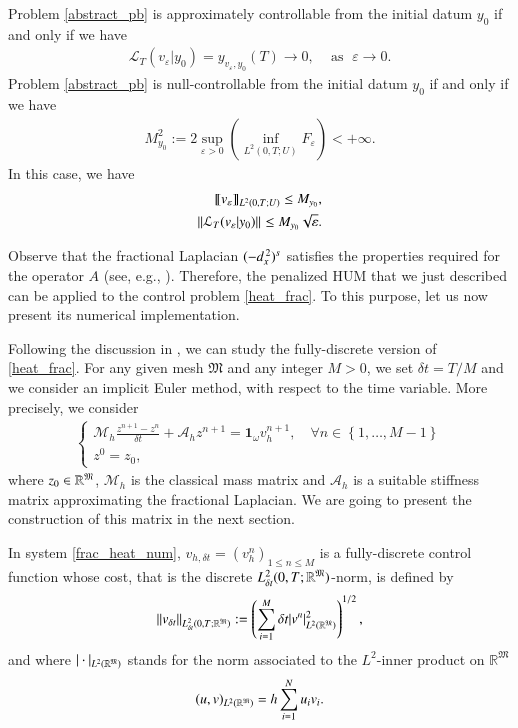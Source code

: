 \begin{theorem}\label{theorem_hum}
Problem \eqref{abstract_pb} is approximately controllable from the initial datum $y_0$ if and only if we have
\begin{align*}
	\mathcal{L}_T(v_\varepsilon|y_0) = y_{v_\varepsilon,y_0}(T)\rightarrow 0,\;\;\;\textrm{ as }\;\varepsilon\to 0.
\end{align*}
Problem \eqref{abstract_pb} is null-controllable from the initial datum $y_0$ if and only if we have
\begin{align*}
	M_{y_0}^2:=2\sup_{\varepsilon>0}\left( \inf_{L^2(0,T;U)}F_\varepsilon\right)<+\infty.
\end{align*}
In this case, we have 
\begin{align*}
	\llbracket v_\varepsilon\rrbracket_{L^2(0,T;U)}\leq M_{y_0},\nonumber
	\\
	{\left\|\mathcal L_T(v_\varepsilon|y_0)\right\|}_{}\leq M_{y_0}\sqrt{\varepsilon}.
\end{align*} 
\end{theorem} 

Observe that the fractional Laplacian $(-d_x^{\,2})^{s}$ satisfies the properties required for the operator $A$ (see, e.g., \cite[Theorem 2.14]{gal2017nonlocal}). Therefore, the penalized HUM that we just described can be applied to the control problem \eqref{heat_frac}. To this purpose, let us now present its numerical implementation. 

Following the discussion in \cite{boyer2011uniform}, we can study the fully-discrete version of \eqref{heat_frac}. For any given mesh $\mathfrak M$ and any integer $M>0$, we set $\delta t=T/M$ and we consider an implicit Euler method, with respect to the time variable. More precisely, we consider
\begin{align}\label{frac_heat_num}
	\begin{cases}
		\displaystyle\mathcal M_h \frac{z^{n+1}-z^n}{\delta t}+\mathcal A_h z^{n+1}=\mathbf{1}_\omega v_h^{n+1}, \quad \forall n\in \left\{1,\ldots,M-1\right\}
		\\
		z^0=z_0, 
	\end{cases}
\end{align}
where $z_0\in \mathbb R^{\mathfrak{M}}$, $\mathcal M_h$ is the classical mass matrix and $\mathcal A_h$ is a suitable stiffness matrix approximating the fractional Laplacian. We are going to present the construction of this matrix in the next section.

In system \eqref{frac_heat_num}, $v_{h,\delta t}=(v_h^n)_{1\leq n\leq M}$ is a fully-discrete control function whose cost, that is the discrete $L_{\delta t}^2(0,T;\mathbb R^{\mathfrak{M}})$-norm, is defined by
\begin{align*}
	\|v_{\delta t}\|_{L_{\delta t}^2(0,T;\mathbb R^{\mathfrak{M}})}:=\left(\sum_{i=1}^M\delta t |v^n|^2_{L^2(\mathbb{R}^{\mathfrak{M}})}\right)^{1/2},
\end{align*}
and where $| \cdot |_{L^2(\mathbb{R}^{\mathfrak{M}})}$ stands for the norm associated to the $L^2$-inner product on $\mathbb{R}^\mathfrak M$
\begin{align*}
	(u,v)_{L^2(\mathbb{R}^{\mathfrak{M}})}=h \sum_{i=1}^N u_i v_i.
\end{align*}

